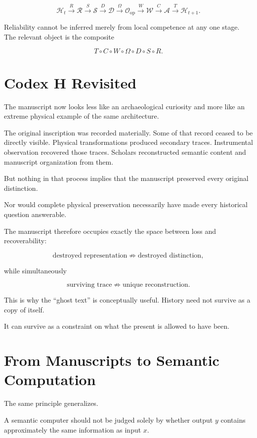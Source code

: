 \documentclass[11pt]{article}
\begin{document}
\[ \mathcal H_t \xrightarrow{R} \mathcal R \xrightarrow{S} \mathcal S \xrightarrow{D} \mathcal D \xrightarrow{\Omega} \mathcal O_{\mathrm{op}} \xrightarrow{W} \mathcal W \xrightarrow{C} \mathcal A \xrightarrow{T} \mathcal H_{t+1}.\]

Reliability cannot be inferred merely from local competence at any one stage. The relevant object is the composite

\[ T\circ C\circ W\circ\Omega\circ D\circ S\circ R.\]

\section{Codex H Revisited}

The manuscript now looks less like an archaeological curiosity and more like an extreme physical example of the same architecture.

The original inscription was recorded materially. Some of that record ceased to be directly visible. Physical transformations produced secondary traces. Instrumental observation recovered those traces. Scholars reconstructed semantic content and manuscript organization from them.

But nothing in that process implies that the manuscript preserved every original distinction.

Nor would complete physical preservation necessarily have made every historical question answerable.

The manuscript therefore occupies exactly the space between loss and recoverability:

\[ \text{destroyed representation} \not\Rightarrow \text{destroyed distinction},\]

while simultaneously

\[ \text{surviving trace} \not\Rightarrow \text{unique reconstruction}.\]

This is why the ``ghost text'' is conceptually useful. History need not survive as a copy of itself.

It can survive as a constraint on what the present is allowed to have been.

\section{From Manuscripts to Semantic Computation}

The same principle generalizes.

A semantic computer should not be judged solely by whether output $y$ contains approximately the same information as input $x$.
\end{document}
